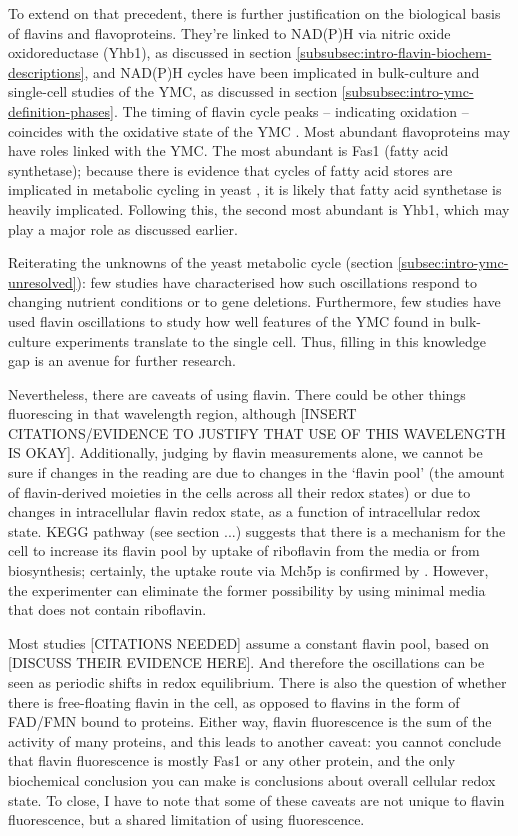 To extend on that precedent, there is further justification on the biological basis of flavins and flavoproteins.
They're linked to NAD(P)H via nitric oxide oxidoreductase (Yhb1), as discussed in section \ref{subsubsec:intro-flavin-biochem-descriptions}, and NAD(P)H cycles have been implicated in bulk-culture \citep{tuLogicYeastMetabolic2005} %
and single-cell \citep{papagiannakisAutonomousMetabolicOscillations2017} studies of the YMC, as discussed in section \ref{subsubsec:intro-ymc-definition-phases}.
The timing of flavin cycle peaks -- indicating oxidation -- coincides with the oxidative state of the YMC \citep{murrayRedoxRegulationRespiring2011}.
Most abundant flavoproteins may have roles linked with the YMC.
The most abundant is Fas1 (fatty acid synthetase); because there is evidence that cycles of fatty acid stores are implicated in metabolic cycling in yeast \citep{campbellBuildingBlocksAre2020}, it is likely that fatty acid synthetase is heavily implicated.
Following this, the second most abundant is Yhb1, which may play a major role as discussed earlier.

Reiterating the unknowns of the yeast metabolic cycle (section \ref{subsec:intro-ymc-unresolved}):
few studies have characterised how such oscillations respond to changing nutrient conditions or to gene deletions.
Furthermore,
few studies have used flavin oscillations to study how well features of the YMC found in bulk-culture experiments translate to the single cell.
Thus, filling in this knowledge gap is an avenue for further research.

Nevertheless, there are caveats of using flavin.
There could be other things fluorescing in that wavelength region, although [INSERT CITATIONS/EVIDENCE TO JUSTIFY THAT USE OF THIS WAVELENGTH IS OKAY].
Additionally, judging by flavin measurements alone, we cannot be sure if changes in the reading are due to changes in the `flavin pool' (the amount of flavin-derived moieties in the cells across all their redox states) or due to changes in intracellular flavin redox state, as a function of intracellular redox state.
KEGG pathway (see section ...) suggests that there is a mechanism for the cell to increase its flavin pool by uptake of riboflavin from the media or from biosynthesis; certainly, the uptake route via Mch5p is confirmed by \textcite{gudipatiFlavoproteomeYeastSaccharomyces2014}.
However, the experimenter can eliminate the former possibility by using minimal media that does not contain riboflavin.

Most studies [CITATIONS NEEDED] assume a constant flavin pool, based on [DISCUSS THEIR EVIDENCE HERE].
And therefore the oscillations can be seen as periodic shifts in redox equilibrium.
There is also the question of whether there is free-floating flavin in the cell, as opposed to flavins in the form of FAD/FMN bound to proteins.
Either way, flavin fluorescence is the sum of the activity of many proteins, and this leads to another caveat: you cannot conclude that flavin fluorescence is mostly Fas1 or any other protein, and the only biochemical conclusion you can make is conclusions about overall cellular redox state.
To close, I have to note that some of these caveats are not unique to flavin fluorescence, but a shared limitation of using fluorescence.

